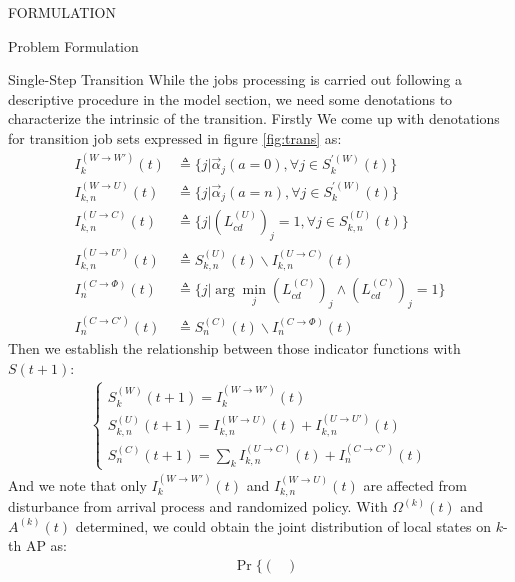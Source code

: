 \documentclass[10pt, conference, letterpaper]{IEEEtran}
\begin{document}
\begin{section}{FORMULATION}
\begin{subsection}{Problem Formulation}
\begin{subsubsection}{Single-Step Transition}
                While the jobs processing is carried out following a descriptive procedure in the model section, we need some denotations to characterize the intrinsic of the transition. Firstly We come up with denotations for transition job sets expressed in figure \ref{fig:trans} as:
                \begin{align}
                    I^{(W \to W')}_{k}(t) & \triangleq \{ j | \vec{\alpha}_j(a=0), \forall j \in S^{'(W)}_k(t)\}
                    \\
                    I^{(W \to U)}_{k,n}(t) &\triangleq \{ j | \vec{\alpha}_j(a=n), \forall j \in S^{'(W)}_k(t)\}
                    \\
                    I^{(U \to C)}_{k,n}(t) &\triangleq \{j|(L^{(U)}_{cd})_j=1, \forall j \in S^{(U)}_{k,n}(t)\}
                    \\
                    I^{(U \to U')}_{k,n}(t) &\triangleq S^{(U)}_{k,n}(t) \backslash I^{(U \to C)}_{k,n}(t)
                    \\
                    I^{(C \to \Phi)}_{n}(t) &\triangleq \{j|\arg\min_{j} (L^{(C)}_{cd})_j \wedge (L^{(C)}_{cd})_j=1\}
                    \\
                    I^{(C \to C')}_{n}(t) &\triangleq S^{(C)}_{n}(t) \backslash I^{(C \to \Phi)}_{n}(t)
                \end{align}
                Then we establish the relationship between those indicator functions with $S(t+1)$:
                \begin{align}
                    \begin{cases}
                        S^{(W)}_{k}(t+1) = I^{(W \to W')}_{k}(t)
                        \\
                        S^{(U)}_{k,n}(t+1) = I^{(W \to U)}_{k,n}(t) + I^{(U \to U')}_{k,n}(t)
                        \\
                        S^{(C)}_{n}(t+1) = \sum_k I^{(U \to C)}_{k,n}(t) + I^{(C \to C')}_{n}(t)
                    \end{cases}
                \end{align}
                And we note that only $I^{(W \to W')}_{k}(t)$ and $I^{(W \to U)}_{k,n}(t)$ are affected from disturbance from arrival process and randomized policy. With $\Omega^{(k)}(t)$ and $A^{(k)}(t)$ determined, we could obtain the joint distribution of local states on $k$-th AP as:
                \begin{align}
                    & \Pr\{\begin{pmatrix}

\end{pmatrix}
\end{align}
\end{subsubsection}
\end{subsection}
\end{section}
\end{document}

